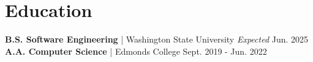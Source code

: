 \section{Education}
\textbf{B.S. Software Engineering} | Washington State University \hfill \textit{Expected} Jun. 2025 \\
\textbf{A.A. Computer Science} | Edmonds College \hfill Sept. 2019 - Jun. 2022